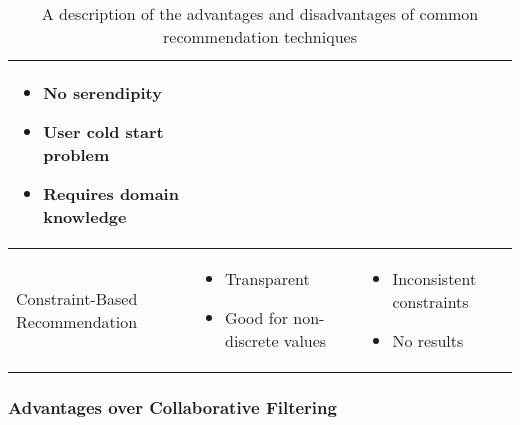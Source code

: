\begin{table}
\begin{center}
\begin{tabularx}{\columnwidth}{X|X|X}
\begin{itemize}[noitemsep,topsep=0pt,parsep=0pt,partopsep=0pt, leftmargin=3.5mm]
                    \item No serendipity
                    \item User cold start problem
                    \item Requires domain knowledge
                \end{itemize} \\
            \hline
            Constraint-Based Recommendation 
            &   \begin{itemize}[noitemsep,topsep=0pt,parsep=0pt,partopsep=0pt, leftmargin=3.5mm]
                    \item Transparent
                    \item Good for non-discrete values
                \end{itemize}
            &   \begin{itemize}[noitemsep,topsep=0pt,parsep=0pt,partopsep=0pt, leftmargin=3.5mm]
                    \item Inconsistent constraints
                    \item No results
                \end{itemize} \\ 
        \end{tabularx}
        \caption{A description of the advantages and disadvantages of common recommendation techniques \cite{richthammerSituationAwarenessRecommender2018, shokeenStudyFeaturesSocial2019,hahslerRecommenderlabFrameworkDeveloping2015, aminiDiscoveringImpactKnowledge2011, suSurveyCollaborativeFiltering2009}}
        \label{tab:Foundations:RecommenderComparison}
    \end{center}
\end{table}

\subsubsection{Advantages over Collaborative Filtering}

